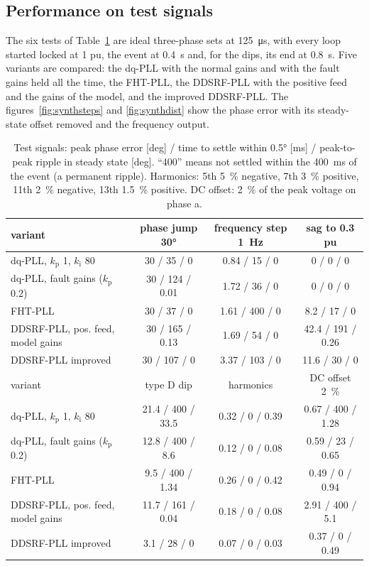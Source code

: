 \documentclass[11pt,a4paper]{scrartcl}
\newcommand{\ped}[1]{_{\mathrm{#1}}}
\begin{document}
\begin{onehalfspace}
\section{Performance on test signals}
\label{sec:synth}

The six tests of Table~\ref{tab:synth} are ideal three-phase sets at \SI{125}{\micro\second}, with every loop started locked at \num{1} pu, the event at \SI{0.4}{\second} and, for the dips, its end at \SI{0.8}{\second}. Five variants are compared: the dq-PLL with the normal gains and with the fault gains held all the time, the FHT-PLL, the DDSRF-PLL with the positive feed and the gains of the model, and the improved DDSRF-PLL. The figures~\ref{fig:synthsteps} and \ref{fig:synthdist} show the phase error with its steady-state offset removed and the frequency output.

\begin{table}[H]
	\centering
	\setlength{\tabcolsep}{3.5pt}
	\setlength{\LTcapwidth}{\textwidth}
	\caption{Test signals: peak phase error [deg] / time to settle within \ang{0.5} [ms] / peak-to-peak ripple in steady state [deg]. ``400'' means not settled within the \SI{400}{\milli\second} of the event (a permanent ripple). Harmonics: 5th \num{5}~\% negative, 7th \num{3}~\% positive, 11th \num{2}~\% negative, 13th \num{1.5}~\% positive. DC offset: \num{2}~\% of the peak voltage on phase a.}
	\label{tab:synth}
	\footnotesize
	\setlength{\tabcolsep}{4pt}
	\begin{tabular}{@{} l c c c @{}}
		\toprule
		variant & phase jump \ang{30} & frequency step \SI{+1}{\hertz} & sag to \num{0.3} pu \\
		\midrule
		dq-PLL, $k\ped{p}$ 1, $k\ped{i}$ 80 & 30 / 35 / 0 & 0.84 / 15 / 0 & 0 / 0 / 0 \\
		dq-PLL, fault gains ($k\ped{p}$ 0.2) & 30 / 124 / 0.01 & 1.72 / 36 / 0 & 0 / 0 / 0 \\
		FHT-PLL & 30 / 37 / 0 & 1.61 / 400 / 0 & 8.2 / 17 / 0 \\
		DDSRF-PLL, pos. feed, model gains & 30 / 165 / 0.13 & 1.69 / 54 / 0 & 42.4 / 191 / 0.26 \\
		DDSRF-PLL improved & 30 / 107 / 0 & 3.37 / 103 / 0 & 11.6 / 30 / 0 \\
		\midrule
		\rowcolor{white} variant & type D dip & harmonics & DC offset \num{2}~\% \\
		\midrule
		dq-PLL, $k\ped{p}$ 1, $k\ped{i}$ 80 & 21.4 / 400 / 33.5 & 0.32 / 0 / 0.39 & 0.67 / 400 / 1.28 \\
		dq-PLL, fault gains ($k\ped{p}$ 0.2) & 12.8 / 400 / 8.6 & 0.12 / 0 / 0.08 & 0.59 / 23 / 0.65 \\
		FHT-PLL & 9.5 / 400 / 1.34 & 0.26 / 0 / 0.42 & 0.49 / 0 / 0.94 \\
		DDSRF-PLL, pos. feed, model gains & 11.7 / 161 / 0.04 & 0.18 / 0 / 0.08 & 2.91 / 400 / 5.1 \\
		DDSRF-PLL improved & 3.1 / 28 / 0 & 0.07 / 0 / 0.03 & 0.37 / 0 / 0.49 \\
		\bottomrule
	\end{tabular}
\end{table}


\end{onehalfspace}
\end{document}

